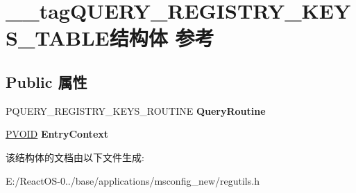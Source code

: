 \hypertarget{struct____tag_q_u_e_r_y___r_e_g_i_s_t_r_y___k_e_y_s___t_a_b_l_e}{}\section{\+\_\+\+\_\+tag\+Q\+U\+E\+R\+Y\+\_\+\+R\+E\+G\+I\+S\+T\+R\+Y\+\_\+\+K\+E\+Y\+S\+\_\+\+T\+A\+B\+L\+E结构体 参考}
\label{struct____tag_q_u_e_r_y___r_e_g_i_s_t_r_y___k_e_y_s___t_a_b_l_e}
\subsection*{Public 属性}
\begin{DoxyCompactItemize}
\item 
\mbox{\label{struct____tag_q_u_e_r_y___r_e_g_i_s_t_r_y___k_e_y_s___t_a_b_l_e_a68b13fe3dd9a61c4bd70372b33e3d3e2}} 
P\+Q\+U\+E\+R\+Y\+\_\+\+R\+E\+G\+I\+S\+T\+R\+Y\+\_\+\+K\+E\+Y\+S\+\_\+\+R\+O\+U\+T\+I\+NE {\bfseries Query\+Routine}
\item 
\mbox{\label{struct____tag_q_u_e_r_y___r_e_g_i_s_t_r_y___k_e_y_s___t_a_b_l_e_a7db7ecd6a8041d76609ff94035840924}} 
\hyperlink{interfacevoid}{P\+V\+O\+ID} {\bfseries Entry\+Context}
\end{DoxyCompactItemize}


该结构体的文档由以下文件生成\+:\begin{DoxyCompactItemize}
\item 
E\+:/\+React\+O\+S-\/0../base/applications/msconfig\+\_\+new/regutils.\+h\end{DoxyCompactItemize}
